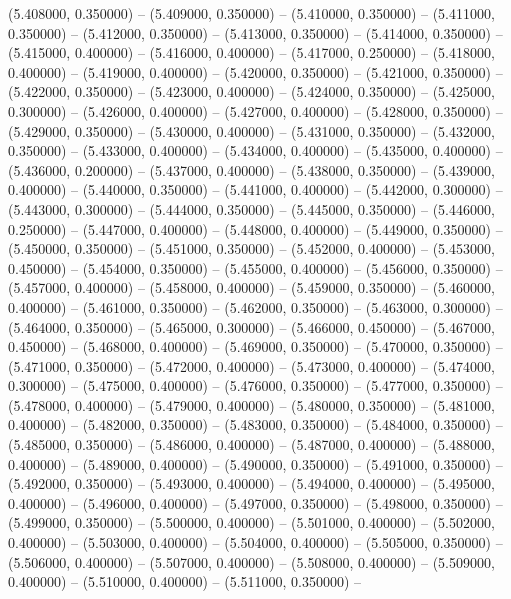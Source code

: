 (5.408000, 0.350000) -- 
(5.409000, 0.350000) -- 
(5.410000, 0.350000) -- 
(5.411000, 0.350000) -- 
(5.412000, 0.350000) -- 
(5.413000, 0.350000) -- 
(5.414000, 0.350000) -- 
(5.415000, 0.400000) -- 
(5.416000, 0.400000) -- 
(5.417000, 0.250000) -- 
(5.418000, 0.400000) -- 
(5.419000, 0.400000) -- 
(5.420000, 0.350000) -- 
(5.421000, 0.350000) -- 
(5.422000, 0.350000) -- 
(5.423000, 0.400000) -- 
(5.424000, 0.350000) -- 
(5.425000, 0.300000) -- 
(5.426000, 0.400000) -- 
(5.427000, 0.400000) -- 
(5.428000, 0.350000) -- 
(5.429000, 0.350000) -- 
(5.430000, 0.400000) -- 
(5.431000, 0.350000) -- 
(5.432000, 0.350000) -- 
(5.433000, 0.400000) -- 
(5.434000, 0.400000) -- 
(5.435000, 0.400000) -- 
(5.436000, 0.200000) -- 
(5.437000, 0.400000) -- 
(5.438000, 0.350000) -- 
(5.439000, 0.400000) -- 
(5.440000, 0.350000) -- 
(5.441000, 0.400000) -- 
(5.442000, 0.300000) -- 
(5.443000, 0.300000) -- 
(5.444000, 0.350000) -- 
(5.445000, 0.350000) -- 
(5.446000, 0.250000) -- 
(5.447000, 0.400000) -- 
(5.448000, 0.400000) -- 
(5.449000, 0.350000) -- 
(5.450000, 0.350000) -- 
(5.451000, 0.350000) -- 
(5.452000, 0.400000) -- 
(5.453000, 0.450000) -- 
(5.454000, 0.350000) -- 
(5.455000, 0.400000) -- 
(5.456000, 0.350000) -- 
(5.457000, 0.400000) -- 
(5.458000, 0.400000) -- 
(5.459000, 0.350000) -- 
(5.460000, 0.400000) -- 
(5.461000, 0.350000) -- 
(5.462000, 0.350000) -- 
(5.463000, 0.300000) -- 
(5.464000, 0.350000) -- 
(5.465000, 0.300000) -- 
(5.466000, 0.450000) -- 
(5.467000, 0.450000) -- 
(5.468000, 0.400000) -- 
(5.469000, 0.350000) -- 
(5.470000, 0.350000) -- 
(5.471000, 0.350000) -- 
(5.472000, 0.400000) -- 
(5.473000, 0.400000) -- 
(5.474000, 0.300000) -- 
(5.475000, 0.400000) -- 
(5.476000, 0.350000) -- 
(5.477000, 0.350000) -- 
(5.478000, 0.400000) -- 
(5.479000, 0.400000) -- 
(5.480000, 0.350000) -- 
(5.481000, 0.400000) -- 
(5.482000, 0.350000) -- 
(5.483000, 0.350000) -- 
(5.484000, 0.350000) -- 
(5.485000, 0.350000) -- 
(5.486000, 0.400000) -- 
(5.487000, 0.400000) -- 
(5.488000, 0.400000) -- 
(5.489000, 0.400000) -- 
(5.490000, 0.350000) -- 
(5.491000, 0.350000) -- 
(5.492000, 0.350000) -- 
(5.493000, 0.400000) -- 
(5.494000, 0.400000) -- 
(5.495000, 0.400000) -- 
(5.496000, 0.400000) -- 
(5.497000, 0.350000) -- 
(5.498000, 0.350000) -- 
(5.499000, 0.350000) -- 
(5.500000, 0.400000) -- 
(5.501000, 0.400000) -- 
(5.502000, 0.400000) -- 
(5.503000, 0.400000) -- 
(5.504000, 0.400000) -- 
(5.505000, 0.350000) -- 
(5.506000, 0.400000) -- 
(5.507000, 0.400000) -- 
(5.508000, 0.400000) -- 
(5.509000, 0.400000) -- 
(5.510000, 0.400000) -- 
(5.511000, 0.350000) -- 
